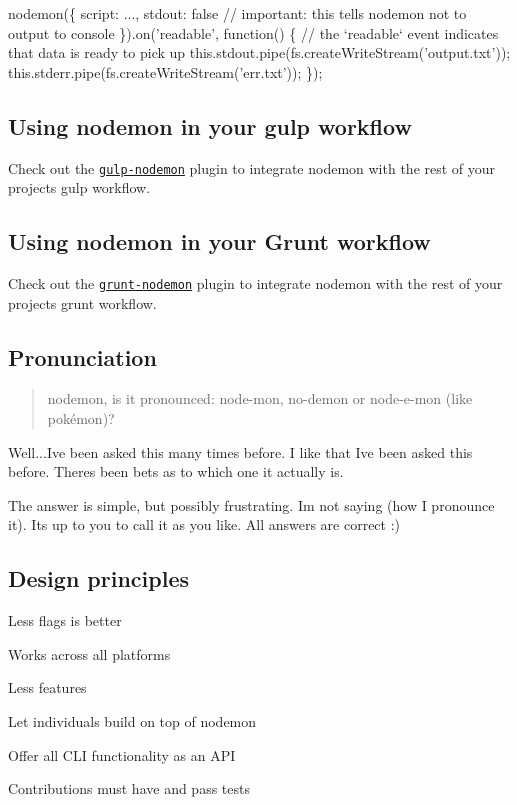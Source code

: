 \begin{DoxyCode}
nodemon(\{
  script: ...,
  stdout: false // important: this tells nodemon not to output to console
\}).on('readable', function() \{ // the `readable` event indicates that data is ready to pick up
  this.stdout.pipe(fs.createWriteStream('output.txt'));
  this.stderr.pipe(fs.createWriteStream('err.txt'));
\});
\end{DoxyCode}


\subsection*{Using nodemon in your gulp workflow}

Check out the \href{https://github.com/JacksonGariety/gulp-nodemon}{\tt gulp-\/nodemon} plugin to integrate nodemon with the rest of your project\textquotesingle{}s gulp workflow.

\subsection*{Using nodemon in your Grunt workflow}

Check out the \href{https://github.com/ChrisWren/grunt-nodemon}{\tt grunt-\/nodemon} plugin to integrate nodemon with the rest of your project\textquotesingle{}s grunt workflow.

\subsection*{Pronunciation}

\begin{quote}
nodemon, is it pronounced\+: node-\/mon, no-\/demon or node-\/e-\/mon (like pokémon)? \end{quote}


Well...I\textquotesingle{}ve been asked this many times before. I like that I\textquotesingle{}ve been asked this before. There\textquotesingle{}s been bets as to which one it actually is.

The answer is simple, but possibly frustrating. I\textquotesingle{}m not saying (how I pronounce it). It\textquotesingle{}s up to you to call it as you like. All answers are correct \+:)

\subsection*{Design principles}


\begin{DoxyItemize}
\item Less flags is better
\item Works across all platforms
\item Less features
\item Let individuals build on top of nodemon
\item Offer all C\+LI functionality as an A\+PI
\item Contributions must have and pass tests
\end{DoxyItemize}

